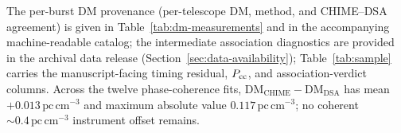 The per-burst DM provenance (per-telescope DM, method, and CHIME--DSA agreement)
is given in Table~\ref{tab:dm-measurements} and in the accompanying
machine-readable catalog; the intermediate association diagnostics are
provided in the archival data release (Section~\ref{sec:data-availability});
Table~\ref{tab:sample} carries the manuscript-facing timing residual, $P_{\rm cc}$,
and association-verdict columns. Across the twelve phase-coherence fits,
$\mathrm{DM_{CHIME}}-\mathrm{DM_{DSA}}$ has mean
$+0.013\,\mathrm{pc\,cm^{-3}}$ and maximum absolute value
$0.117\,\mathrm{pc\,cm^{-3}}$; no coherent $\sim0.4\,\mathrm{pc\,cm^{-3}}$
instrument offset remains.
